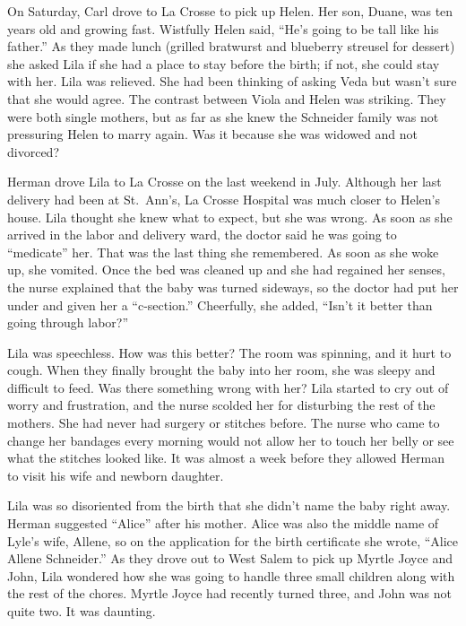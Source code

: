 \documentclass[
  letterpaper,
]{book}
\begin{document}
On Saturday, Carl drove to La Crosse to pick up Helen. Her son, Duane,
was ten years old and growing fast. Wistfully Helen said, ``He's going
to be tall like his father.'' As they made lunch (grilled bratwurst and
blueberry streusel for dessert) she asked Lila if she had a place to
stay before the birth; if not, she could stay with her. Lila was
relieved. She had been thinking of asking Veda but wasn't sure that she
would agree. The contrast between Viola and Helen was striking. They
were both single mothers, but as far as she knew the Schneider family
was not pressuring Helen to marry again. Was it because she was widowed
and not divorced?

Herman drove Lila to La Crosse on the last weekend in July. Although her
last delivery had been at St.~Ann's, La Crosse Hospital was much closer
to Helen's house. Lila thought she knew what to expect, but she was
wrong. As soon as she arrived in the labor and delivery ward, the doctor
said he was going to ``medicate'' her. That was the last thing she
remembered. As soon as she woke up, she vomited. Once the bed was
cleaned up and she had regained her senses, the nurse explained that the
baby was turned sideways, so the doctor had put her under and given her
a ``c-section.'' Cheerfully, she added, ``Isn't it better than going
through labor?''

Lila was speechless. How was this better? The room was spinning, and it
hurt to cough. When they finally brought the baby into her room, she was
sleepy and difficult to feed. Was there something wrong with her? Lila
started to cry out of worry and frustration, and the nurse scolded her
for disturbing the rest of the mothers. She had never had surgery or
stitches before. The nurse who came to change her bandages every morning
would not allow her to touch her belly or see what the stitches looked
like. It was almost a week before they allowed Herman to visit his wife
and newborn daughter.

Lila was so disoriented from the birth that she didn't name the baby
right away. Herman suggested ``Alice'' after his mother. Alice was also
the middle name of Lyle's wife, Allene, so on the application for the
birth certificate she wrote, ``Alice Allene Schneider.'' As they drove
out to West Salem to pick up Myrtle Joyce and John, Lila wondered how
she was going to handle three small children along with the rest of the
chores. Myrtle Joyce had recently turned three, and John was not quite
two. It was daunting.
\end{document}

